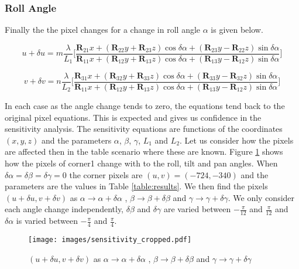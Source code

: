 \documentclass[12pt]{article}
\newcommand{\mtx}[1]{\ensuremath{\mathbf{#1}}}
\begin{document}
\subsubsection{Roll Angle}

Finally the the pixel changes for a change in roll angle $\alpha$ is given below.

\begin{equation}\label{dualpha}
    u + \delta u = m\frac{\lambda}{L_1}
        \bigg[\frac{\mtx{R}_{21}x + (\mtx{R}_{22}y + \mtx{R}_{23}z)\cos\delta\alpha 
                   +(\mtx{R}_{23}y - \mtx{R}_{22}z)\sin\delta\alpha}
                   {\mtx{R}_{11}x + (\mtx{R}_{12}y + \mtx{R}_{13}z)\cos\delta\alpha 
                   +(\mtx{R}_{13}y - \mtx{R}_{12}z)\sin\delta\alpha}                  
        \bigg]
\end{equation}

\begin{equation}\label{dvalpha}
    v + \delta v = n\frac{\lambda}{L_2}
        \bigg[\frac{\mtx{R}_{31}x + (\mtx{R}_{32}y + \mtx{R}_{33}z)\cos\delta\alpha 
                   +(\mtx{R}_{33}y - \mtx{R}_{32}z)\sin\delta\alpha}
                   {\mtx{R}_{11}x + (\mtx{R}_{12}y + \mtx{R}_{13}z)\cos\delta\alpha 
                   +(\mtx{R}_{13}y - \mtx{R}_{12}z)\sin\delta\alpha}                  
        \bigg]
\end{equation}

In each case as the angle change tends to zero, the equations tend back to the original pixel equations. This is expected and gives us confidence in the sensitivity analysis.
The sensitivity equations are functions of the coordinates $(x,y,z)$ and the parameters $\alpha$, $\beta$, $\gamma$, $L_1$ and $L_2$. Let us consider how the pixels are affected then in the table scenario where these are known. Figure \ref{fig:sensitivity} shows how the pixels of corner1 change with to the roll, tilt and pan angles. When $\delta\alpha=\delta\beta=\delta\gamma=0$ the corner pixels are $(u,v) =(-724,-340)$ and the parameters are the values in Table \ref{table:results}. We then find the pixels $(u + \delta u,v + \delta v)$ as $\alpha \rightarrow \alpha + \delta\alpha$ , $\beta \rightarrow \beta + \delta\beta$ and $\gamma \rightarrow \gamma + \delta\gamma$. We only consider each angle change independently, $\delta\beta$ and $\delta\gamma$ are varied between $-\frac{\pi}{12}$ and  $\frac{\pi}{12}$ and $\delta\alpha$ is varied between $-\frac{\pi}{4}$ and  $\frac{\pi}{4}$.

\begin{figure}
\centering
\texttt{[image: images/sensitivity\_cropped.pdf]}
\caption{$(u + \delta u,v + \delta v)$ as $\alpha \rightarrow \alpha + \delta\alpha$ , $\beta \rightarrow \beta + \delta\beta$ and $\gamma \rightarrow \gamma + \delta\gamma$}\label{fig:sensitivity}
\end{figure}
\end{document}

